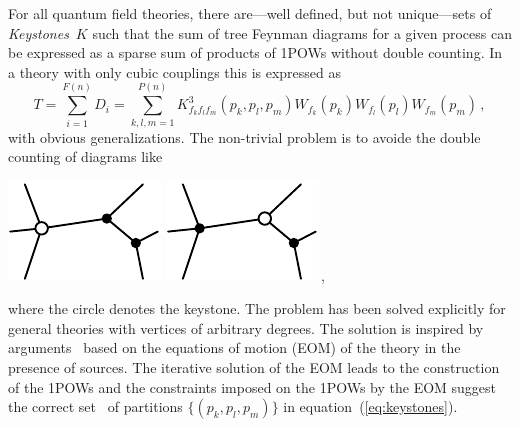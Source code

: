 \documentclass[12pt,a4paper]{article}
\begin{document}
For all quantum field theories, there are---well defined, but not
unique---sets of \emph{Keystones}~$K$ such that the sum
of tree Feynman diagrams for a given process can be expressed as a
sparse sum of products of 1POWs without double counting.  In a theory
with only cubic couplings this is expressed as
\begin{equation}
\label{eq:keystones}
  T = \sum_{i=1}^{F(n)} D_i =
      \sum_{k,l,m=1}^{P(n)}
        K^{3}_{f_kf_lf_m}(p_k,p_l,p_m)
        W_{f_k}(p_k)W_{f_l}(p_l)W_{f_m}(p_m)\,,
\end{equation}
with obvious generalizations.
The non-trivial problem is to avoide the
double counting of diagrams like
\begin{center}
   \includegraphics{omega-paper-1-pics-7}
   \qquad\qquad
   \includegraphics{omega-paper-1-pics-8}\,,
\end{center} 
where the circle denotes the keystone. The problem has been solved
explicitly for general theories with vertices of arbitrary
degrees.  The solution is inspired by
arguments~\cite{ALPHA:1997} based on the equations of motion (EOM) of
the theory in the presence of sources. The iterative solution of the
EOM leads to the construction of the 1POWs and the constraints imposed
on the 1POWs by the EOM suggest the correct set~\cite{ALPHA:1997} of
partitions $\{(p_k,p_l,p_m)\}$ in equation~(\ref{eq:keystones}).
\end{document}
